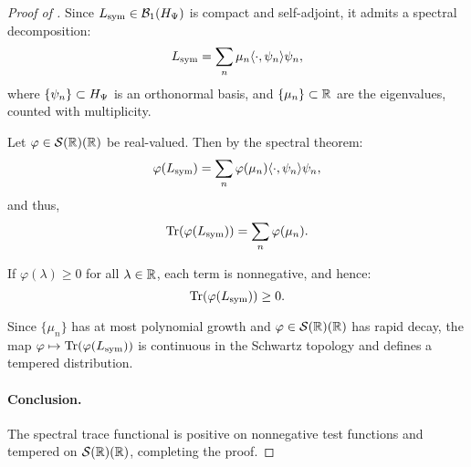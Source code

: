 \begin{proof}[Proof of ]
Since \( L_{\mathrm{sym}} \in \mathcal{B}_1(H_{\Psi}) \) is compact and self-adjoint, it admits a spectral decomposition:
\[
L_{\mathrm{sym}} = \sum_n \mu_n \langle \cdot, \psi_n \rangle \psi_n,
\]
where \( \{ \psi_n \} \subset H_{\Psi} \) is an orthonormal basis, and \( \{ \mu_n \} \subset \mathbb{R} \) are the eigenvalues, counted with multiplicity.

Let \( \varphi \in \mathcal{S}(\mathbb{R})(\mathbb{R}) \) be real-valued. Then by the spectral theorem:
\[
\varphi(L_{\mathrm{sym}}) = \sum_n \varphi(\mu_n) \langle \cdot, \psi_n \rangle \psi_n,
\]
and thus,
\[
\operatorname{Tr}(\varphi(L_{\mathrm{sym}})) = \sum_n \varphi(\mu_n).
\]

If \( \varphi(\lambda) \ge 0 \) for all \( \lambda \in \mathbb{R} \), each term is nonnegative, and hence:
\[
\operatorname{Tr}(\varphi(L_{\mathrm{sym}})) \ge 0.
\]

Since \( \{ \mu_n \} \) has at most polynomial growth and \( \varphi \in \mathcal{S}(\mathbb{R})(\mathbb{R}) \) has rapid decay, the map \( \varphi \mapsto \operatorname{Tr}(\varphi(L_{\mathrm{sym}})) \) is continuous in the Schwartz topology and defines a tempered distribution.

\paragraph{Conclusion.}
The spectral trace functional is positive on nonnegative test functions and tempered on \( \mathcal{S}(\mathbb{R})(\mathbb{R}) \), completing the proof.
\end{proof}
